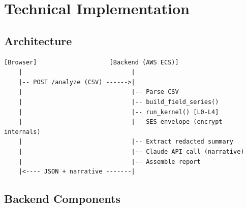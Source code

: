 \documentclass[11pt,letterpaper]{article}
\begin{document}
\section{Technical Implementation}

\subsection{Architecture}

\begin{verbatim}
[Browser]                    [Backend (AWS ECS)]
    |                              |
    |-- POST /analyze (CSV) ------>|
    |                              |-- Parse CSV
    |                              |-- build_field_series()
    |                              |-- run_kernel() [L0-L4]
    |                              |-- SES envelope (encrypt internals)
    |                              |-- Extract redacted summary
    |                              |-- Claude API call (narrative)
    |                              |-- Assemble report
    |<---- JSON + narrative -------|
\end{verbatim}

\subsection{Backend Components}
\end{document}
